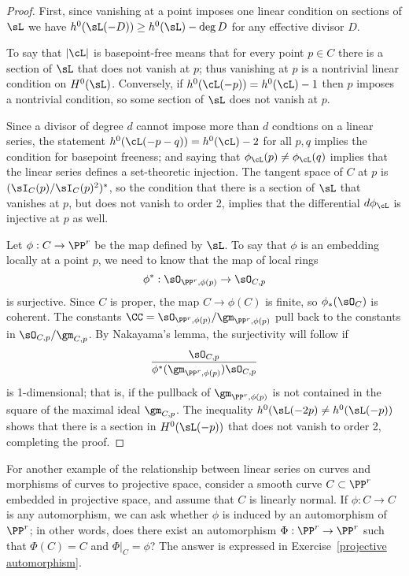 \begin{proof}
First, since vanishing at a point imposes one linear condition on sections of $\sL$ we have $h^0(\sL(-D)) \geq h^0(\sL)-\deg D$ for any
effective divisor $D$.

To say that $|\cL|$ is basepoint-free means that for every point $p\in C$ there is a section of $\sL$ that does not vanish at $p$; thus vanishing
at $p$ is a nontrivial linear condition on $H^0(\sL)$. Conversely, if $h^0(\cL(-p)) = h^0(\cL) - 1$ then $p$ imposes a nontrivial condition, so
some section of $\sL$ does not vanish at $p$.

Since a divisor of degree $d$ cannot impose more than $d$ condtions on a linear series, the statement $h^0(\cL(-p-q)) = h^0(\cL) - 2$ for all $p, q$ implies the condition for basepoint freeness; and saying that $\phi_\cL(p) \neq \phi_\cL(q)$ implies that the linear series defines a set-theoretic injection. The tangent space of $C$ at $p$ is $(\sI_C(p)/\sI_C(p)^2)^*$, so the condition that there is a section of $\sL$ that vanishes at $p$, but does not vanish
to order 2, implies that the differential $d\phi_\cL$ is injective at $p$ as well.

Let $\phi:C \to \PP^r$ be the map defined by $\sL$. To say that $\phi$  is an embedding locally at a point $p$, we need to know that the map of local rings
$$
\phi^*: \sO_{\PP^r,\phi(p)} \to \sO_{C,p} 
$$
is surjective. Since $C$ is proper, the map $C\to \phi(C)$ is finite,
so $\phi_*(\sO_{C})$ is coherent.
 The constants  $\CC =\sO_{\PP^r,\phi(p)}/\gm_{\PP^r,\phi(p)}$ pull back to the constants in
$\sO_{C,p}/\gm_{C,p}$. 
By Nakayama's lemma, the surjectivity will follow if 
$$
\frac{\sO_{C,p}}
{\phi^*(\gm_{\PP^r,\phi(p)})  \sO_{C,p}}
$$
is 1-dimensional; that is, if  the pullback of $\gm_{\PP^r,\phi(p)}$ is not contained in the square of the
maximal ideal $\gm_{C,p}$. The inequality $h^0(\sL(-2p) \neq h^0(\sL(-p))$ shows that there is a 
section in $H^0(\sL(-p))$ that does not vanish to order 2, completing the proof.
\end{proof}


For another example of the relationship between linear series on curves and morphisms of curves to projective space, consider a smooth curve $C \subset \PP^r$ embedded in projective space, and assume that $C$ is linearly normal. If $\phi : C \to C$ is any automorphism, we can ask whether $\phi$ is induced by an automorphism of $\PP^r$; in other words, does there exist an automorphism $\Phi : \PP^r \to \PP^r$ such that $\Phi(C) = C$ and $\Phi|_C = \phi$? The answer is expressed in Exercise~\ref{projective automorphism}.



